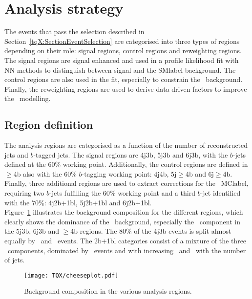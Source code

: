 \section{Analysis strategy}
The events that pass the selection described in Section~\ref{tqX:SectionEventSelection} are categorised into three types of regions depending on their role: signal regions, control regions and reweighting regions.\\

The signal regions are signal enhanced and used in a profile likelihood fit with NN methods to distinguish between signal and the \acrshort{SMlabel} background. The control regions are also used in the fit, especially to constrain the \ttb\ background. Finally, the reweighting regions are used to derive data-driven factors to improve the \ttbar\ modelling.

\subsection{Region definition}

The analysis regions are categorised as a function of the number of reconstructed jets and $b$-tagged jets. The signal regions are 4j3b, 5j3b and 6j3b, with the $b$-jets defined at the 60\% working point. Additionally, the control regions are defined in $\geq$4b also with the 60\% $b$-tagging working point: 4j4b, 5j$\geq$4b and 6j$\geq$4b. Finally, three additional regions are used to extract corrections for the \ttbar\ \acrshort{MClabel}, requiring two $b$-jets fulfilling the 60\% working point and a third $b$-jet identified with the 70\%: 4j2b+1bl, 5j2b+1bl and 6j2b+1bl.\\

Figure~\ref{tqX:cheeseplots} illustrates the background composition for the different regions, which clearly shows the dominance of the \ttbar\ background, especially the \ttb\ component in the 5j3b, 6j3b and $\geq$4b regions. The 80\% of the 4j3b events is split almost equally by \ttb\ and \ttl\ events. The 2b+1bl categories consist of a mixture of the three \ttbar\ components, dominated by \ttl\ events and with increasing \ttc\ and \ttb\ with the number of jets.\\

\begin{figure}[htbp]
    \RawFloats
    \begin{center}
    \texttt{[image: TQX/cheeseplot.pdf]}
    \caption{
        Background composition in the various analysis regions.
    }
    \label{tqX:cheeseplots}
    \end{center}
\end{figure}

